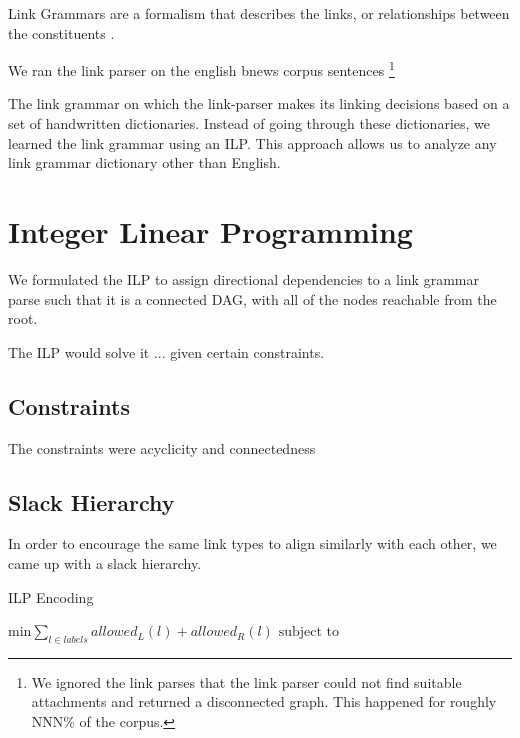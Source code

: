 \documentclass[11pt]{article}
\begin{document}
Link Grammars are a formalism that describes the links, or relationships between the constituents \cite{SleatorTemperly91}. 


We ran the link parser on the english bnews corpus sentences \footnote{We ignored the link parses that the link parser could not find suitable attachments and returned a disconnected graph. This happened for roughly NNN\% of the corpus.}


The link grammar on which the link-parser makes its linking decisions based on a set of handwritten dictionaries. Instead of going through these dictionaries, we learned the link grammar using an ILP. This approach allows us to analyze any link grammar dictionary other than English.


\section{Integer Linear Programming}



We formulated the ILP to assign directional dependencies to a link grammar parse such that it is a connected DAG, with all of the nodes reachable from the root.


The ILP would solve it
... given certain constraints.




\subsection{Constraints}

The constraints were
acyclicity and connectedness


\subsection{Slack Hierarchy}


In order to encourage the same link types to align similarly with each other,
we came up with a slack hierarchy.




\begin{algorithm}
\caption{ILP Encoding}\label{ILP}
\begin{algorithmic}[1]

\State $\text{min} \sum_{l \in labels} allowed_L(l) + allowed_R(l)$
\State $\text{subject to}$

\end{algorithmic}
\end{algorithm}
\end{document}
